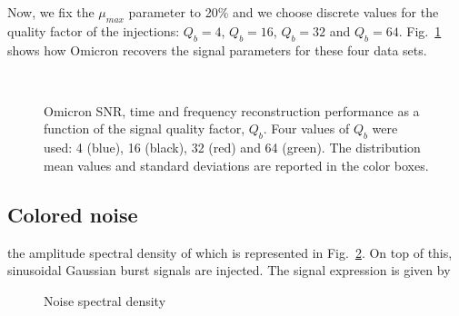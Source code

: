 Now, we fix the $\mu_{max}$ parameter to 20\% and we choose discrete values for the quality factor of the injections: $Q_b=4$, $Q_b=16$, $Q_b=32$ and $Q_b=64$. Fig.~\ref{fig:char_q} shows how Omicron recovers the signal parameters for these four data sets.
\begin{figure}
  \center
   \\
  \caption{Omicron SNR, time and frequency reconstruction performance as a function of the signal quality factor, $Q_b$. Four values of $Q_b$ were used: 4 (blue), 16 (black), 32 (red) and 64 (green). The distribution mean values and standard deviations are reported in the color boxes.}
  \label{fig:char_q}
\end{figure}


\subsection{Colored noise} \label{sec:characterization:colored}

the amplitude spectral density of which is represented in Fig.~\ref{fig:noise_asd}. On top of this, sinusoidal Gaussian burst signals are injected. The signal expression is given by 
\begin{figure}
  \center
  \caption{Noise spectral density}
  \label{fig:noise_asd}
\end{figure}
